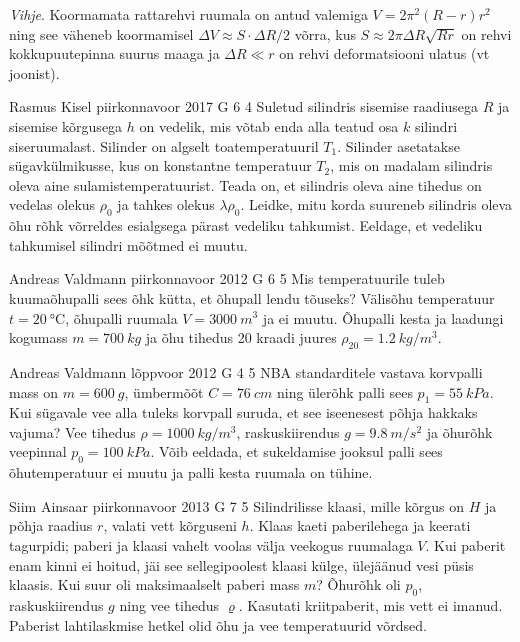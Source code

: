 \documentclass[11pt]{article}
\begin{document}
{{\textit{Vihje}. Koormamata rattarehvi ruumala on antud valemiga $V=2\pi^{2}\left(R-r\right)r^{2}$
ning see väheneb koormamisel $\Delta V\approx S\cdot\Delta R/2$ võrra,
kus $S\approx2\pi\Delta R\sqrt{Rr}$ on rehvi kokkupuutepinna suurus
maaga ja $\Delta R\ll r$ on rehvi deformatsiooni ulatus (vt joonist).
\fi
}

{Rasmus Kisel} %
{piirkonnavoor} %
{2017} %
{G 6} %
{4} %
{
\ifStatement
Suletud silindris sisemise raadiusega $R$ ja sisemise kõrgusega $h$ on vedelik, mis võtab enda alla teatud osa $k$ silindri siseruumalast. Silinder on algselt toatemperatuuril $T_{1}$. Silinder asetatakse sügavkülmikusse, kus on konstantne temperatuur $T_{2}$, mis on madalam silindris oleva aine sulamistemperatuurist. Teada on, et silindris oleva aine tihedus on vedelas olekus $\rho_0$ ja tahkes olekus $\lambda\rho_0$. Leidke, mitu korda suureneb silindris oleva õhu rõhk võrreldes esialgsega pärast vedeliku tahkumist. Eeldage, et vedeliku tahkumisel silindri mõõtmed ei muutu.
\fi
}

{Andreas Valdmann} %
{piirkonnavoor} %
{2012} %
{G 6} %
{5} %
{
\ifStatement
Mis temperatuurile tuleb kuumaõhupalli sees õhk kütta, et õhupall lendu tõuseks?
Välisõhu temperatuur $t=\SI{20}{\celsius}$, õhupalli ruumala $V=\SI{3000}{m^3}$ ja ei
muutu. Õhupalli kesta ja laadungi kogumass $m=\SI{700}{kg}$ ja õhu tihedus
20 kraadi juures $\rho_{20}=\SI{1,2}{kg/m^3}$.
\fi
}

{Andreas Valdmann} %
{lõppvoor} %
{2012} %
{G 4} %
{5} %
{
\ifStatement
NBA standarditele vastava korvpalli mass on $m=\SI{600}{g}$, ümbermõõt
$C=\SI{76}{cm}$ ning ülerõhk palli sees $p_1=\SI{55}{kPa}$. Kui sügavale vee
alla tuleks korvpall suruda, et see iseenesest põhja hakkaks vajuma? Vee tihedus
$\rho=\SI{1000}{kg/m^3}$, raskuskiirendus $g=\SI{9,8}{m/s^2}$ ja õhurõhk
veepinnal $p_0=\SI{100}{kPa}$. Võib eeldada, et sukeldamise jooksul palli sees
õhutemperatuur ei muutu ja palli kesta ruumala on tühine.
\fi
}

{Siim Ainsaar} %
{piirkonnavoor} %
{2013} %
{G 7} %
{5} %
{
\ifStatement
Silindrilisse klaasi, mille kõrgus on $H$ ja põhja raadius $r$, valati
vett kõrguseni $h$. Klaas kaeti paberilehega ja keerati
tagurpidi; paberi ja
klaasi vahelt voolas välja veekogus ruumalaga $V$. Kui paberit enam kinni ei
hoitud, jäi see sellegipoolest klaasi külge, ülejäänud vesi püsis klaasis.
Kui suur oli maksimaalselt paberi mass $m$? Õhurõhk oli $p_0$,
raskuskiirendus $g$ ning vee tihedus $\varrho$.
Kasutati kriitpaberit, mis vett ei imanud. Paberist lahtilaskmise hetkel olid 
õhu ja vee temperatuurid võrdsed.
\fi
}

}
\end{document}
